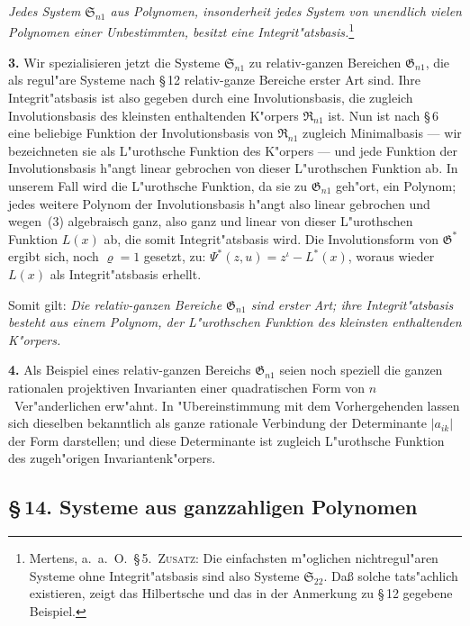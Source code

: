 \documentclass[11pt,a4paper]{article}
\begin{document}
\smallskip
\emph{Jedes System $\mathfrak{S}_{n1}$ aus Polynomen, insonderheit jedes System von
unendlich vielen Polynomen einer Unbestimmten, besitzt eine
Integrit"{a}tsbasis.}\footnote{Mertens, a.\ a.\ O.\ \S\,5.\ \textsc{Zusatz}: Die einfachsten
m"{o}glichen nichtregul"{a}ren Systeme ohne Integrit"{a}tsbasis sind also Systeme
$\mathfrak{S}_{22}$. Da\ss{} solche tats"{a}chlich existieren, zeigt das Hilbertsche und das in der
Anmerkung zu \S\,12 gegebene Beispiel.}

\smallskip
\noindent
\textbf{3.} Wir spezialisieren jetzt die Systeme $\mathfrak{S}_{n1}$ zu relativ-ganzen
Bereichen $\mathfrak{G}_{n1}$, die als regul"{a}re Systeme nach \S\,12 relativ-ganze Bereiche
erster Art sind. Ihre Integrit"{a}tsbasis ist also gegeben durch eine
Involutionsbasis, die zugleich Involutionsbasis des kleinsten enthaltenden
K"{o}rpers $\mathfrak{R}_{n1}$ ist. Nun ist nach \S\,6 eine beliebige Funktion der
Involutionsbasis von $\mathfrak{R}_{n1}$ zugleich Minimalbasis --- wir bezeichneten sie
als L"{u}rothsche Funktion des K"{o}rpers --- und jede Funktion der
Involutionsbasis h"{a}ngt linear gebrochen von dieser L"{u}rothschen Funktion
ab. In unserem Fall wird die L"{u}rothsche Funktion, da sie zu $\mathfrak{G}_{n1}$ geh"{o}rt,
ein Polynom; jedes weitere Polynom der Involutionsbasis h"{a}ngt also
linear gebrochen und wegen~(3) algebraisch ganz, also ganz und linear
von dieser L"{u}rothschen Funktion $L(x)$ ab, die somit Integrit"{a}tsbasis wird.
Die Involutionsform von $\mathfrak{G}^{*}$ ergibt sich, noch $\varrho=1$ gesetzt, zu:
$\Psi^{*}(z,u)=z^{\iota}-L^{*}(x)$,
woraus wieder $L(x)$ als Integrit"{a}tsbasis erhellt.

Somit gilt: \emph{Die relativ-ganzen Bereiche $\mathfrak{G}_{n1}$ sind erster Art; ihre
Integrit"{a}tsbasis besteht aus einem Polynom, der L"{u}rothschen Funktion des
kleinsten enthaltenden K"{o}rpers.}

\smallskip
\noindent
\textbf{4.} Als Beispiel eines relativ-ganzen Bereichs $\mathfrak{G}_{n1}$ seien noch
speziell die ganzen rationalen projektiven Invarianten einer quadratischen
Form von $n$~Ver"{a}nderlichen erw"{a}hnt. In "{U}bereinstimmung mit dem
Vorhergehenden lassen sich dieselben bekanntlich als ganze rationale
Verbindung der Determinante $|a_{ik}|$ der Form darstellen; und diese
Determinante ist zugleich L"{u}rothsche Funktion des zugeh"{o}rigen
Invariantenk"{o}rpers.

\subsection*{\S\,14. Systeme aus ganzzahligen Polynomen}
\end{document}
